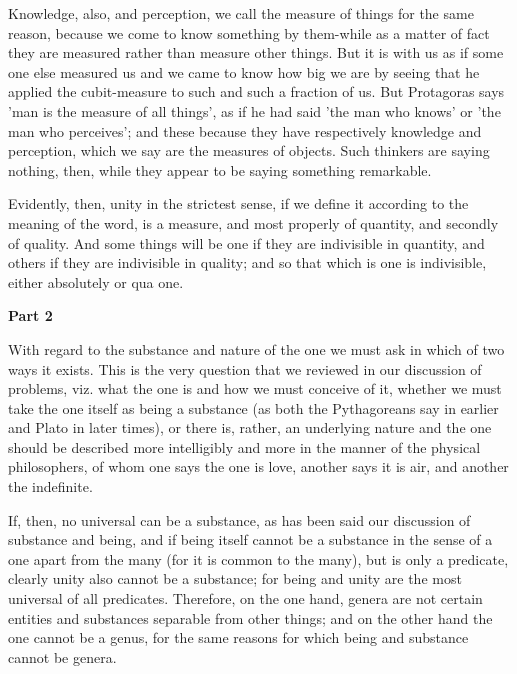 Knowledge, also, and perception, we call the measure of things for the same reason, because we come to know something by them-while as a matter of fact they are measured rather than measure other things. But it is with us as if some one else measured us and we came to know how big we are by seeing that he applied the cubit-measure to such and such a fraction of us. But Protagoras says 'man is the measure of all things', as if he had said 'the man who knows' or 'the man who perceives'; and these because they have respectively knowledge and perception, which we say are the measures of objects. Such thinkers are saying nothing, then, while they appear to be saying something remarkable.

Evidently, then, unity in the strictest sense, if we define it according to the meaning of the word, is a measure, and most properly of quantity, and secondly of quality. And some things will be one if they are indivisible in quantity, and others if they are indivisible in quality; and so that which is one is indivisible, either absolutely or qua one.

\textbf{Part 2}

With regard to the substance and nature of the one we must ask in which of two ways it exists. This is the very question that we reviewed in our discussion of problems, viz. what the one is and how we must conceive of it, whether we must take the one itself as being a substance (as both the Pythagoreans say in earlier and Plato in later times), or there is, rather, an underlying nature and the one should be described more intelligibly and more in the manner of the physical philosophers, of whom one says the one is love, another says it is air, and another the indefinite.

If, then, no universal can be a substance, as has been said our discussion of substance and being, and if being itself cannot be a substance in the sense of a one apart from the many (for it is common to the many), but is only a predicate, clearly unity also cannot be a substance; for being and unity are the most universal of all predicates. Therefore, on the one hand, genera are not certain entities and substances separable from other things; and on the other hand the one cannot be a genus, for the same reasons for which being and substance cannot be genera.

